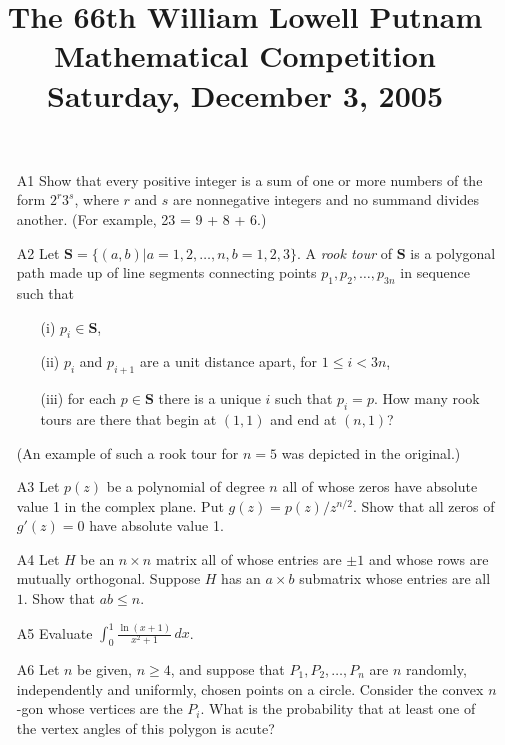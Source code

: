\documentclass[amssymb,twocolumn,pra,10pt,aps]{revtex4-1}
\begin{document}
\title{The 66th William Lowell Putnam Mathematical Competition \\
    Saturday, December 3, 2005}
\maketitle

\begin{itemize}

\item[A1]
Show that every positive integer is a sum of one or more numbers of the
form $2^r 3^s$, where $r$ and $s$ are nonnegative integers and no
summand divides another.
(For example, 23 = 9 + 8 + 6.)

\item[A2]
Let $\mathbf{S} = \{(a,b) | a = 1, 2, \dots,n, b = 1,2,3\}$.
A \emph{rook tour} of $\mathbf{S}$ is a polygonal path made up of line
segments connecting points $p_1, p_2, \dots, p_{3n}$ in sequence such that
\begin{enumerate}
\item[(i)] $p_i \in \mathbf{S}$,
\item[(ii)] $p_i$ and $p_{i+1}$ are a unit distance apart, for
$1 \leq i <3n$,
\item[(iii)] for each $p \in \mathbf{S}$ there is a unique $i$ such that
$p_i = p$. How many rook tours are there that begin at $(1,1)$
and end at $(n,1)$?
\end{enumerate}
(An example of such a rook tour for $n=5$ was depicted in the original.)

\item[A3]
Let $p(z)$ be a polynomial of degree $n$ all of whose zeros have absolute
value 1 in the complex  plane. Put $g(z) = p(z)/z^{n/2}$. Show that all zeros
of $g'(z) = 0$ have absolute value 1.

\item[A4]
Let $H$ be an $n \times n$ matrix all of whose entries are $\pm 1$ and
whose rows are mutually orthogonal. Suppose $H$ has an $a \times b$ submatrix
whose entries are all $1$. Show that $ab \leq n$.

\item[A5]
Evaluate $\int_0^1 \frac{\ln(x+1)}{x^2+1}\,dx$.

\item[A6]
Let $n$ be given, $n \geq 4$, and suppose that $P_1, P_2, \dots, P_n$
are $n$ randomly, independently and uniformly, chosen points on a circle.
Consider the convex $n$-gon whose vertices are the $P_i$. What is the
probability that at least one of the vertex angles of this polygon is
acute?


\end{itemize}
\end{document}
